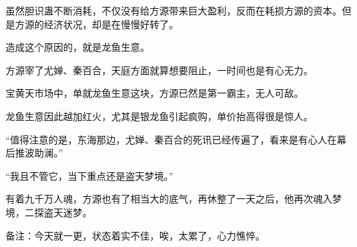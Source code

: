 \begin{this_body}
虽然胆识蛊不断消耗，不仅没有给方源带来巨大盈利，反而在耗损方源的资本。但是方源的经济状况，却是在慢慢好转了。

造成这个原因的，就是龙鱼生意。

方源宰了尤婵、秦百合，天庭方面就算想要阻止，一时间也是有心无力。

宝黄天市场中，单就龙鱼生意这块，方源已然是第一霸主，无人可敌。

龙鱼生意因此越加红火，尤其是银龙鱼引起疯购，单价抬高得很是惊人。

“值得注意的是，东海那边，尤婵、秦百合的死讯已经传遍了，看来是有心人在幕后推波助澜。”

“我且不管它，当下重点还是盗天梦境。”

有着九千万人魂，方源也有了相当大的底气，再休整了一天之后，他再次魂入梦境，二探盗天迷梦。

备注：今天就一更，状态着实不佳，唉，太累了，心力憔悴。

\end{this_body}


